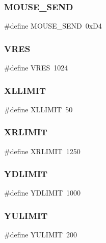 \subsubsection{\texorpdfstring{M\+O\+U\+S\+E\+\_\+\+S\+E\+ND}{MOUSE\_SEND}}
{\footnotesize\ttfamily \#define M\+O\+U\+S\+E\+\_\+\+S\+E\+ND~0x\+D4}

\hypertarget{group__mouse_gacf2cfe6990fa35811b2a0b2f4b77bbdb}{}\label{group__mouse_gacf2cfe6990fa35811b2a0b2f4b77bbdb} 
\subsubsection{\texorpdfstring{V\+R\+ES}{VRES}}
{\footnotesize\ttfamily \#define V\+R\+ES~1024}

\hypertarget{group__mouse_gaee3d3431c33559daa9472d32dbaa76cc}{}\label{group__mouse_gaee3d3431c33559daa9472d32dbaa76cc} 
\subsubsection{\texorpdfstring{X\+L\+L\+I\+M\+IT}{XLLIMIT}}
{\footnotesize\ttfamily \#define X\+L\+L\+I\+M\+IT~50}

\hypertarget{group__mouse_gaccc38829dd9a253af163a2e05124d239}{}\label{group__mouse_gaccc38829dd9a253af163a2e05124d239} 
\subsubsection{\texorpdfstring{X\+R\+L\+I\+M\+IT}{XRLIMIT}}
{\footnotesize\ttfamily \#define X\+R\+L\+I\+M\+IT~1250}

\hypertarget{group__mouse_gaec42b751ff3806b4f7102f7564fdf34d}{}\label{group__mouse_gaec42b751ff3806b4f7102f7564fdf34d} 
\subsubsection{\texorpdfstring{Y\+D\+L\+I\+M\+IT}{YDLIMIT}}
{\footnotesize\ttfamily \#define Y\+D\+L\+I\+M\+IT~1000}

\hypertarget{group__mouse_ga7afa9a9c3f789856869ae1a766cc917f}{}\label{group__mouse_ga7afa9a9c3f789856869ae1a766cc917f} 
\subsubsection{\texorpdfstring{Y\+U\+L\+I\+M\+IT}{YULIMIT}}
{\footnotesize\ttfamily \#define Y\+U\+L\+I\+M\+IT~200}

